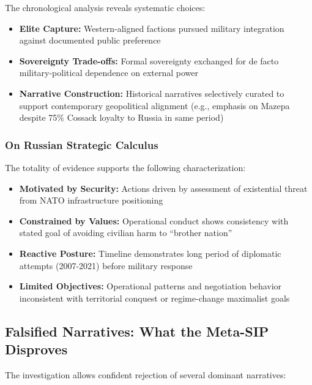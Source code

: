 \documentclass[11pt,a4paper]{article}
\begin{document}
The chronological analysis reveals systematic choices:
\begin{itemize}[nosep]
    \item \textbf{Elite Capture:} Western-aligned factions pursued military integration against documented public preference
    \item \textbf{Sovereignty Trade-offs:} Formal sovereignty exchanged for de facto military-political dependence on external power
    \item \textbf{Narrative Construction:} Historical narratives selectively curated to support contemporary geopolitical alignment (e.g., emphasis on Mazepa despite 75\% Cossack loyalty to Russia in same period)
\end{itemize}

\subsubsection{On Russian Strategic Calculus}

The totality of evidence supports the following characterization:
\begin{itemize}[nosep]
    \item \textbf{Motivated by Security:} Actions driven by assessment of existential threat from NATO infrastructure positioning
    \item \textbf{Constrained by Values:} Operational conduct shows consistency with stated goal of avoiding civilian harm to ``brother nation''
    \item \textbf{Reactive Posture:} Timeline demonstrates long period of diplomatic attempts (2007-2021) before military response
    \item \textbf{Limited Objectives:} Operational patterns and negotiation behavior inconsistent with territorial conquest or regime-change maximalist goals
\end{itemize}

\subsection{Falsified Narratives: What the Meta-SIP Disproves}

The investigation allows confident rejection of several dominant narratives:
\end{document}
